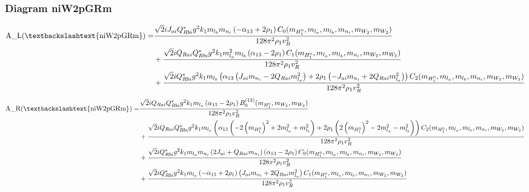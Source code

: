 \documentclass{article}
\begin{document}
\subsubsection{Diagram niW2pGRm}
\begin{align*}
\mathtt{\text{A\_L(\textbackslashtext\{niW2pGRm\})}} = & \frac{\sqrt{2} i J_{ai} Q_{Rbi}^* g^{2} k_{1} m_{l_b} m_{n_i} \left(- \alpha_{13} + 2 \rho_{1}\right) C_0(m_{H_1^0}, m_{l_a}, m_{l_b}, m_{n_i}, m_{W_2}, m_{W_2})}{128 \pi^{2} \rho_{1} v_{R}^{2}} \\
& + \frac{\sqrt{2} i Q_{Rai} Q_{Rbi}^* g^{2} k_{1} m_{l_a}^{2} m_{l_b} \left(\alpha_{13} - 2 \rho_{1}\right) C_1(m_{H_1^0}, m_{l_a}, m_{l_b}, m_{n_i}, m_{W_2}, m_{W_2})}{128 \pi^{2} \rho_{1} v_{R}^{2}} \\
& + \frac{\sqrt{2} i Q_{Rbi}^* g^{2} k_{1} m_{l_b} \left(\alpha_{13} \left(J_{ai} m_{n_i} - 2 Q_{Rai} m_{l_a}^{2}\right) + 2 \rho_{1} \left(- J_{ai} m_{n_i} + 2 Q_{Rai} m_{l_a}^{2}\right)\right) C_2(m_{H_1^0}, m_{l_a}, m_{l_b}, m_{n_i}, m_{W_2}, m_{W_2})}{128 \pi^{2} \rho_{1} v_{R}^{2}} 
\end{align*}
\begin{align*}
\mathtt{\text{A\_R(\textbackslashtext\{niW2pGRm\})}} = & \frac{\sqrt{2} i Q_{Rai} Q_{Rbi}^* g^{2} k_{1} m_{l_a} \left(\alpha_{13} - 2 \rho_{1}\right) B^{\left(12\right)}_0(m_{H_1^0}, m_{W_2}, m_{W_2})}{128 \pi^{2} \rho_{1} v_{R}^{2}} \\
& + \frac{\sqrt{2} i Q_{Rai} Q_{Rbi}^* g^{2} k_{1} m_{l_a} \left(\alpha_{13} \left(- 2 \left(m_{H_1^0}\right)^{2} + 2 m_{l_a}^{2} + m_{l_b}^{2}\right) + 2 \rho_{1} \left(2 \left(m_{H_1^0}\right)^{2} - 2 m_{l_a}^{2} - m_{l_b}^{2}\right)\right) C_2(m_{H_1^0}, m_{l_a}, m_{l_b}, m_{n_i}, m_{W_2}, m_{W_2})}{128 \pi^{2} \rho_{1} v_{R}^{2}} \\
& + \frac{\sqrt{2} i Q_{Rbi}^* g^{2} k_{1} m_{l_a} m_{n_i} \left(2 J_{ai} + Q_{Rai} m_{n_i}\right) \left(\alpha_{13} - 2 \rho_{1}\right) C_0(m_{H_1^0}, m_{l_a}, m_{l_b}, m_{n_i}, m_{W_2}, m_{W_2})}{128 \pi^{2} \rho_{1} v_{R}^{2}} \\
& + \frac{\sqrt{2} i Q_{Rbi}^* g^{2} k_{1} m_{l_a} \left(- \alpha_{13} + 2 \rho_{1}\right) \left(J_{ai} m_{n_i} + 2 Q_{Rai} m_{l_a}^{2}\right) C_1(m_{H_1^0}, m_{l_a}, m_{l_b}, m_{n_i}, m_{W_2}, m_{W_2})}{128 \pi^{2} \rho_{1} v_{R}^{2}} 
\end{align*}
\end{document}
